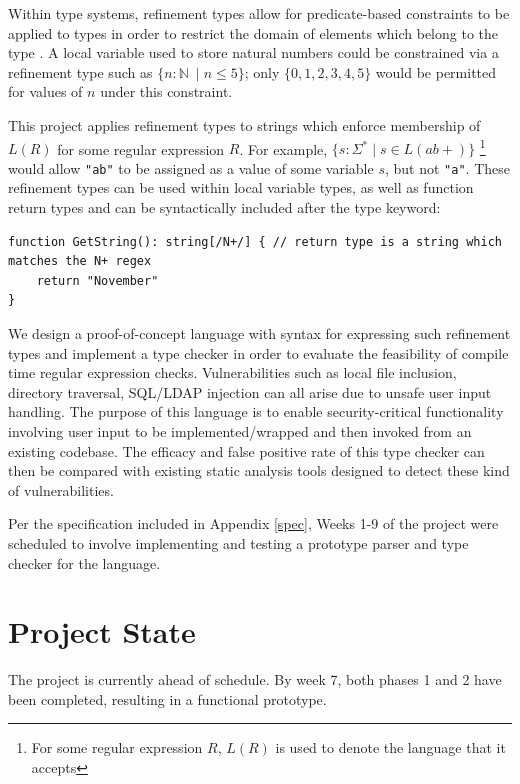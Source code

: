 \documentclass[a4paper]{article}
\begin{document}
    Within type systems, refinement types allow for predicate-based constraints to be applied to types in order to restrict the domain of elements which belong to the type \citep{benjaminpierce2002}. A local variable used to store natural numbers could be constrained via a refinement type such as $\{n: \mathbb{N}\ \mid n \leq 5\}$;  only $\{0, 1, 2, 3, 4, 5\}$ would be permitted for values of $n$ under this constraint.
    
    This project applies refinement types to strings which enforce membership of $L(R)$ for some regular expression $R$. For example, $\{s: \Sigma^* \mid s \in L(ab+)\}$ \footnote{For some regular expression $R$, $L(R)$ is used to denote the language that it accepts} would allow \texttt{"ab"} to be assigned as a value of some variable $s$, but not \texttt{"a"}. These refinement types can be used within local variable types, as well as function return types and can be syntactically included after the type keyword:
    
    \begin{verbatim}
function GetString(): string[/N+/] { // return type is a string which matches the N+ regex
    return "November"
}
    \end{verbatim}
    
    We design a proof-of-concept language with syntax for expressing such refinement types and implement a type checker in order to evaluate the feasibility of compile time regular expression checks. Vulnerabilities such as local file inclusion, directory traversal, SQL/LDAP injection can all arise due to unsafe user input handling. The purpose of this language is to enable security-critical functionality involving user input to be implemented/wrapped and then invoked from an existing codebase. The efficacy and false positive rate of this type checker can then be compared with existing static analysis tools designed to detect these kind of vulnerabilities.

    Per the specification included in Appendix \ref{spec}, Weeks 1-9 of the project were scheduled to involve implementing and testing a prototype parser and type checker for the language.
    
    \section{Project State}
    
    The project is currently ahead of schedule. By week 7, both phases 1 and 2 have been completed, resulting in a functional prototype.
    
\end{document}
